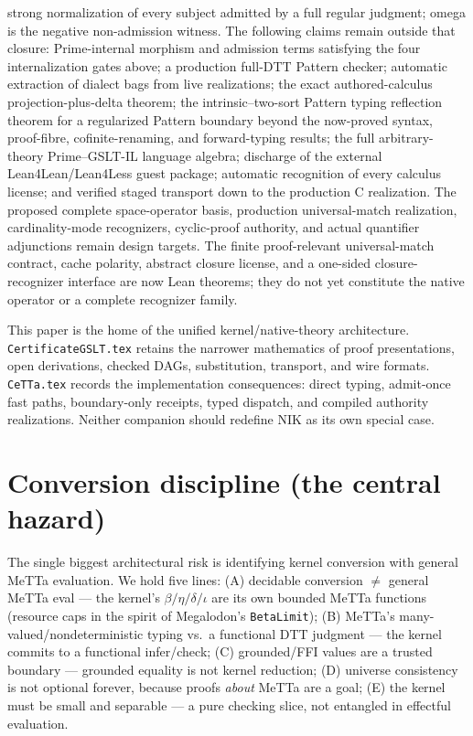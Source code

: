 \documentclass[11pt]{article}
\newcommand{\MeTTa}{MeTTa}
\newcommand{\DTT}{DTT}
\newcommand{\NIK}{NIK}
\newcommand{\code}[1]{\texttt{#1}}
\begin{document}
strong normalization of every subject admitted by a full regular judgment;
omega is the negative non-admission witness.
The following claims remain outside that closure: Prime-internal morphism and
admission terms satisfying the four internalization gates above; a production full-DTT Pattern
checker; automatic extraction of dialect bags from live realizations; the exact
authored-calculus projection-plus-delta theorem; the intrinsic--two-sort Pattern typing
reflection theorem for a regularized Pattern boundary beyond the now-proved syntax,
proof-fibre, cofinite-renaming, and forward-typing results; the full
arbitrary-theory Prime--GSLT-IL language algebra; discharge of
the external Lean4Lean/Lean4Less guest package; automatic recognition of every
calculus license; and verified staged transport down to the production C
realization.  The proposed complete space-operator basis, production
universal-match realization, cardinality-mode recognizers, cyclic-proof
authority, and actual quantifier adjunctions remain design targets.  The finite
proof-relevant universal-match contract, cache polarity, abstract closure
license, and a one-sided closure-recognizer interface are now Lean theorems;
they do not yet constitute the native operator or a complete recognizer family.

This paper is the home of the unified kernel/native-theory architecture.
\code{CertificateGSLT.tex} retains the narrower mathematics of proof presentations,
open derivations, checked DAGs, substitution, transport, and wire formats.
\code{CeTTa.tex} records the implementation consequences: direct typing,
admit-once fast paths, boundary-only receipts, typed dispatch, and compiled
authority realizations.  Neither companion should redefine \NIK{} as its own
special case.

\section{Conversion discipline (the central hazard)}
\label{sec:conv}
The single biggest architectural risk is identifying kernel conversion with general
\MeTTa{} evaluation. We hold five lines:
(A) decidable conversion $\ne$ general \MeTTa{} eval --- the kernel's
$\beta/\eta/\delta/\iota$ are its own bounded \MeTTa{} functions (resource caps in
the spirit of Megalodon's \code{BetaLimit});
(B) \MeTTa{}'s many-valued/nondeterministic typing vs.\ a functional \DTT{}
judgment --- the kernel commits to a functional infer/check;
(C) grounded/FFI values are a trusted boundary --- grounded equality is not kernel
reduction;
(D) universe consistency is not optional forever, because proofs \emph{about}
\MeTTa{} are a goal;
(E) the kernel must be small and separable --- a pure checking slice, not entangled
in effectful evaluation.
\end{document}

